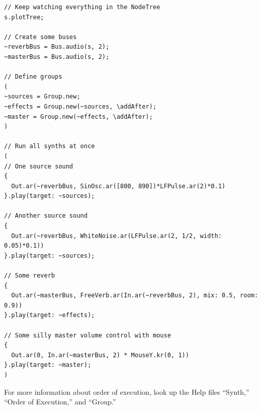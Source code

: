 \begin{lstlisting}[style=SuperCollider-IDE, basicstyle=\scttfamily\footnotesize]
// Keep watching everything in the NodeTree
s.plotTree;

// Create some buses
~reverbBus = Bus.audio(s, 2);
~masterBus = Bus.audio(s, 2);

// Define groups
(
~sources = Group.new;
~effects = Group.new(~sources, \addAfter);
~master = Group.new(~effects, \addAfter);
)

// Run all synths at once
(
// One source sound
{
  Out.ar(~reverbBus, SinOsc.ar([800, 890])*LFPulse.ar(2)*0.1)
}.play(target: ~sources);

// Another source sound
{
  Out.ar(~reverbBus, WhiteNoise.ar(LFPulse.ar(2, 1/2, width: 0.05)*0.1))
}.play(target: ~sources);

// Some reverb
{
  Out.ar(~masterBus, FreeVerb.ar(In.ar(~reverbBus, 2), mix: 0.5, room: 0.9))
}.play(target: ~effects);

// Some silly master volume control with mouse
{
  Out.ar(0, In.ar(~masterBus, 2) * MouseY.kr(0, 1))
}.play(target: ~master);
)
\end{lstlisting}

For more information about order of execution, look up the Help files ``Synth,'' ``Order of Execution,'' and ``Group.''